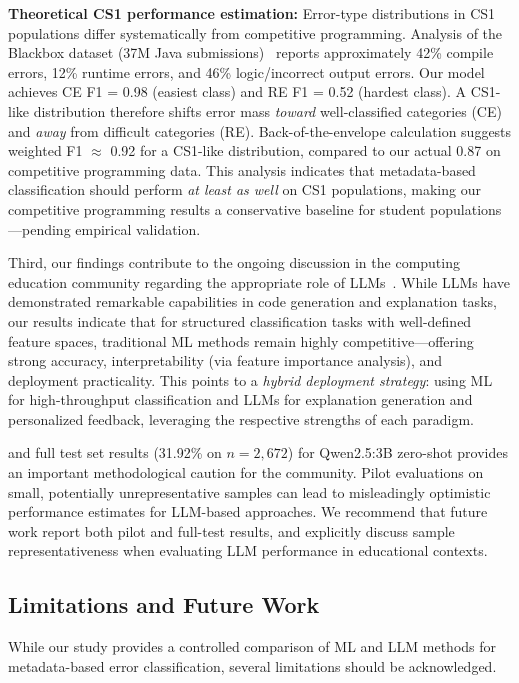 \documentclass[acmsmall]{acmart}
\begin{document}
\textbf{Theoretical CS1 performance estimation:} Error-type distributions in CS1
populations differ systematically from competitive programming. Analysis of the
Blackbox dataset (37M Java submissions)~\cite{altadmri2015most} reports approximately
42\% compile errors, 12\% runtime errors, and 46\% logic/incorrect output errors.
Our model achieves CE F1 = 0.98 (easiest class) and RE F1 = 0.52 (hardest class).
A CS1-like distribution therefore shifts error mass \emph{toward} well-classified
categories (CE) and \emph{away} from difficult categories (RE). Back-of-the-envelope
calculation suggests weighted F1 $\approx$ 0.92 for a CS1-like distribution, compared
to our actual 0.87 on competitive programming data. This analysis indicates that
metadata-based classification should perform \emph{at least as well} on CS1 populations,
making our competitive programming results a conservative baseline for student
populations---pending empirical validation.

Third, our findings contribute to the ongoing discussion in the computing
education community regarding the appropriate role of
LLMs~\cite{finnie2022robots,kazemitabaar2024impact}. While LLMs have
demonstrated remarkable capabilities in code generation and explanation tasks,
our results indicate that for structured classification tasks with
well-defined feature spaces, traditional ML methods remain highly
competitive---offering strong accuracy, interpretability (via feature
importance analysis), and deployment practicality. This points to a
\textit{hybrid deployment strategy}: using ML for high-throughput
classification and LLMs for explanation generation and personalized
feedback, leveraging the respective strengths of each paradigm.

and full test set results (31.92\% on $n=2{,}672$) for Qwen2.5:3B zero-shot
provides an important methodological caution for the community.
Pilot evaluations on small, potentially unrepresentative samples can
lead to misleadingly optimistic performance estimates for LLM-based
approaches. We recommend that future work report both pilot and full-test
results, and explicitly discuss sample representativeness when evaluating
LLM performance in educational contexts.

\subsection{Limitations and Future Work}

While our study provides a controlled comparison of ML and LLM methods
for metadata-based error classification, several limitations should be
acknowledged.
\end{document}
